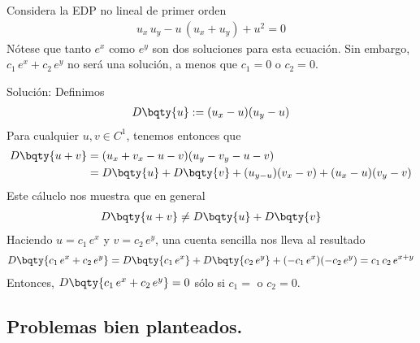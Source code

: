 \begin{ejemplo}
Considera la EDP no lineal de primer orden
\begin{align*}
u_{x} \, u_{y} - u \, (u_{x} + u_{y}) + u^{2} = 0
\end{align*}
Nótese que tanto $e^{x}$ como $e^{y}$ son dos soluciones para esta ecuación. Sin embargo, $c_{1} \, e^{x} + c_{2} \, e^{y}$ no será una solución, a menos que $c_{1} = 0$ o $c_{2} = 0$.
\par
Solución: Definimos
\begin{align*}
D \bqty{u} := (u_{x} - u)(u_{y} - u)
\end{align*}
Para cualquier $u, v \in C^{1}$, tenemos entonces que
\begin{align*}
D \bqty{u + v} &= (u_{x}  + v_{x} - u - v)(u_{y} - v_{y} - u -v) \\
&= D \bqty{u} + D \bqty{v} + (u_{y - u})(v_{x} - v) + (u_{x} - u)(v_{y} - v)
\end{align*}
Este cáluclo nos muestra que en general
\begin{align*}
D \bqty{u + v} \neq D \bqty{u} + D \bqty{v}
\end{align*}
Haciendo $u = c_{1} \, e^{x}$ y $v = c_{2} \, e^{y}$, una cuenta sencilla nos lleva al resultado
\begin{align*}
D \bqty{c_{1} \, e^{x} + c_{2} \, e^{y}} = D \bqty{c_{1} \, e^{x}} + D \bqty{c_{2} \, e^{y}} + (-c_{1} \, e^{x})(-c_{2} \, e^{y}) = c_{1} \, c_{2} \, e^{x + y} 
\end{align*}
Entonces, $D \bqty{c_{1} \, e^{x} + c_{2} \, e^{y}} = 0$ sólo si $c_{1} = $ o $c_{2} = 0$.
\end{ejemplo}
\subsection{Problemas bien planteados.}
